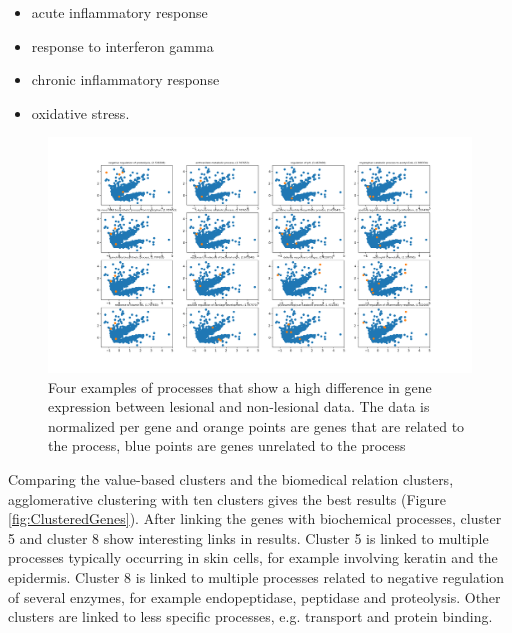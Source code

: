 \documentclass[10pt,a4paper]{article}
\begin{document}
	\begin{itemize}
		\item acute inflammatory response
		\item response to interferon gamma 
		\item chronic inflammatory response
		\item oxidative stress.
	\end{itemize}
	
	\begin{figure}[H]
		\includegraphics[width=1\textwidth]{Sign_Processes_Psoriasis.png}
		\caption{Four examples of processes that show a high difference in gene expression between lesional and non-lesional data. The data is normalized per gene and orange points are genes that are related to the process, blue points are genes unrelated to the process}
		\label{fig:ProcessesScaledBySample}
	\end{figure}	
	
	Comparing the value-based clusters and the biomedical relation clusters, agglomerative clustering with ten clusters gives the best results (Figure \ref{fig:ClusteredGenes}). After linking the genes with biochemical processes, cluster 5 and cluster 8 show interesting links in results. Cluster 5 is linked to multiple processes typically occurring in skin cells, for example involving keratin and the epidermis. Cluster 8 is linked to multiple processes related to negative regulation of several enzymes, for example endopeptidase, peptidase and proteolysis. Other clusters are linked to less specific processes, e.g. transport and protein binding.
	
\end{document}
